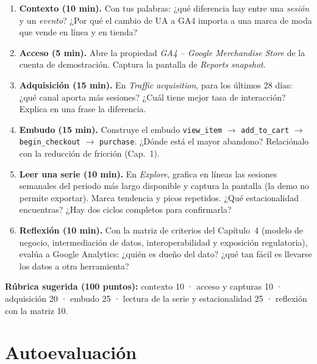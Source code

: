 \documentclass[11pt,letterpaper]{article}
\begin{document}
\begin{enumerate}
  \item \textbf{Contexto (10 min).} Con tus palabras: ¿qué diferencia hay entre una \emph{sesión} y un \emph{evento}? ¿Por qué el cambio de UA a GA4 importa a una marca de moda que vende en línea y en tienda?
  \item \textbf{Acceso (5 min).} Abre la propiedad \emph{GA4 -- Google Merchandise Store} de la cuenta de demostración. Captura la pantalla de \emph{Reports snapshot}.
  \item \textbf{Adquisición (15 min).} En \emph{Traffic acquisition}, para los últimos 28 días: ¿qué canal aporta más sesiones? ¿Cuál tiene mejor tasa de interacción? Explica en una frase la diferencia.
  \item \textbf{Embudo (15 min).} Construye el embudo \texttt{view\_item} $\rightarrow$ \texttt{add\_to\_cart} $\rightarrow$ \texttt{begin\_checkout} $\rightarrow$ \texttt{purchase}. ¿Dónde está el mayor abandono? Relaciónalo con la reducción de fricción (Cap.~1).
  \item \textbf{Leer una serie (10 min).} En \emph{Explore}, grafica en líneas las sesiones semanales del periodo más largo disponible y captura la pantalla (la demo no permite exportar). Marca tendencia y picos repetidos. ¿Qué estacionalidad encuentras? ¿Hay dos ciclos completos para confirmarla?
  \item \textbf{Reflexión (10 min).} Con la matriz de criterios del Capítulo~4 (modelo de negocio, intermediación de datos, interoperabilidad y exposición regulatoria), evalúa a Google Analytics: ¿quién es dueño del dato? ¿qué tan fácil es llevarse los datos a otra herramienta?
\end{enumerate}

\textbf{Rúbrica sugerida (100 puntos):} contexto 10 · acceso y capturas 10 · adquisición 20 · embudo 25 · lectura de la serie y estacionalidad 25 · reflexión con la matriz 10.

\section{Autoevaluación}
\end{document}
